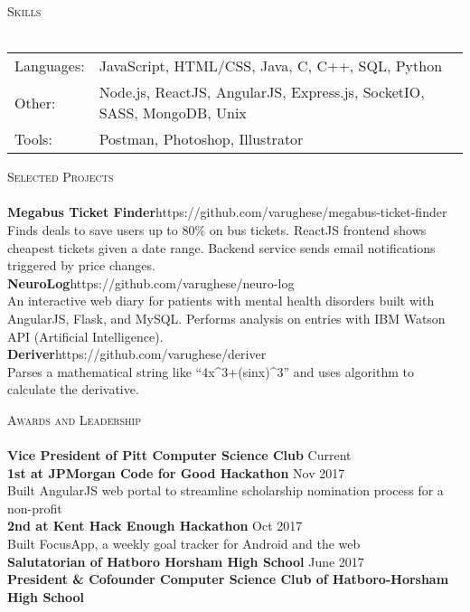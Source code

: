 \documentclass[a4paper]{article}
\newcommand{\lineunder} {
    \vspace*{-8pt} \\
    \hspace*{-18pt} \hrulefill \\
}
\newcommand{\header} [1] {
    {\hspace*{-18pt}\vspace*{6pt} \textsc{#1}}
    \vspace*{-6pt} \lineunder
}
\begin{document}
\header{Skills}
\begin{tabular}{ l l }
	Languages: & JavaScript, HTML/CSS, Java, C, C++, SQL, Python                        \\
	Other:     & Node.js, ReactJS, AngularJS, Express.js, SocketIO, SASS, MongoDB, Unix \\
	Tools:     & Postman, Photoshop, Illustrator                                        \\
\end{tabular}
\vspace{2mm}

\header{Selected Projects}
{\textbf{Megabus Ticket Finder}}\hfill https://github.com/varughese/megabus-ticket-finder\\
Finds deals to save users up to 80\% on bus tickets. ReactJS frontend shows cheapest tickets given a date range. Backend service sends email notifications triggered by price changes.\\
\vspace*{2mm}
{\textbf{NeuroLog}}\hfill https://github.com/varughese/neuro-log\\
An interactive web diary for patients with mental health disorders built with AngularJS, Flask, and MySQL. Performs analysis on entries with IBM Watson API (Artificial Intelligence).\\
\vspace*{2mm}
{\textbf{Deriver}}\hfill https://github.com/varughese/deriver\\
Parses a mathematical string like “4x\textasciicircum{}3+(sinx)\textasciicircum{}3” and uses algorithm to calculate the derivative.\\
\vspace*{2mm}

\header{Awards and Leadership}
\textbf{Vice President of Pitt Computer Science Club} \hfill Current\\

\vspace*{2mm}
\textbf{1st at JPMorgan Code for Good Hackathon} \hfill Nov 2017 \\
Built AngularJS web portal to streamline scholarship nomination process for a non-profit \\
\vspace*{2mm}
\textbf{2nd at Kent Hack Enough Hackathon}  \hfill Oct 2017 \\
Built FocusApp, a weekly goal tracker for Android and the web \\
\vspace*{2mm}
\textbf{Salutatorian of Hatboro Horsham High School} \hfill June 2017 \\
\vspace*{2mm}
\textbf{President \& Cofounder Computer Science Club of Hatboro-Horsham High School}\\

\vspace*{2mm}

\ 
\end{document}
